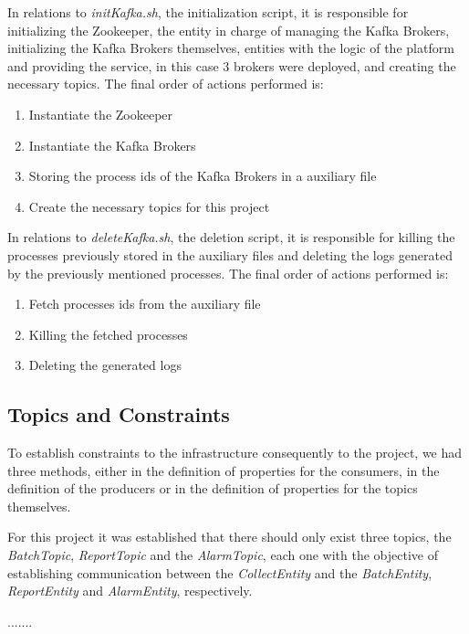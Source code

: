 \documentclass[12pt]{article}
\begin{document}
In relations to \textit{initKafka.sh}, the initialization script, it is responsible for initializing the Zookeeper, the entity in charge of managing the Kafka Brokers, initializing the Kafka Brokers themselves, entities with the logic of the platform and providing the service, in this case 3 brokers were deployed, and creating the necessary topics. The final order of actions performed is:

\begin{enumerate}
  \item Instantiate the Zookeeper
  \item Instantiate the Kafka Brokers
  \item Storing the process ids of the Kafka Brokers in a auxiliary file
  \item Create the necessary topics for this project
\end{enumerate}

In relations to \textit{deleteKafka.sh}, the deletion script, it is responsible for killing the processes previously stored in the auxiliary files and deleting the logs generated by the previously mentioned processes. The final order of actions performed is:

\begin{enumerate}
  \item Fetch processes ids from the auxiliary file
  \item Killing the fetched processes
  \item Deleting the generated logs
\end{enumerate}

\subsection{Topics and Constraints}\label{topics} %
To establish constraints to the infrastructure consequently to the project, we had three methods, either in the definition of properties for the consumers, in the definition of the producers or in the definition of properties for the topics themselves.

For this project it was established that there should only exist three topics, the \textit{BatchTopic}, \textit{ReportTopic} and the \textit{AlarmTopic}, each one with the objective of establishing communication between the \textit{CollectEntity} and the \textit{BatchEntity}, \textit{ReportEntity} and \textit{AlarmEntity}, respectively.

.......
\end{document}
